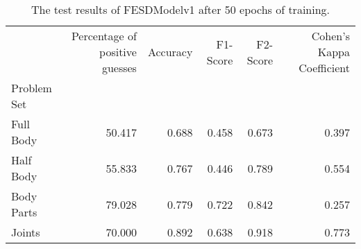 \begin{table}[!htbp]
  \caption[Test Results of FESDModelv1]{The test results of FESDModelv1 after 50 epochs of training.}
  \label{tab:res_v1}
  \begin{tabular}{lrrrrr}
    \hline
    {} &  Percentage of positive guesses &  Accuracy &  F1-Score &  F2-Score &  Cohen's Kappa Coefficient \\
    Problem Set   &                                 &           &           &           &                            \\
    \hline
    Full Body  &                          50.417 &     0.688 &     0.458 &     0.673 &                      0.397 \\
    Half Body  &                          55.833 &     0.767 &     0.446 &     0.789 &                      0.554 \\
    Body Parts &                          79.028 &     0.779 &     0.722 &     0.842 &                      0.257 \\
    Joints     &                          70.000 &     0.892 &     0.638 &     0.918 &                      0.773 \\
    \hline
  \end{tabular}
\end{table}
